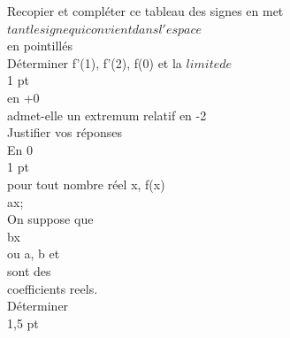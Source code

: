 
\begin{exercice}[Analyse]
\label{ex:58}

Recopier et compléter ce tableau des signes en met$tant le signe qui convient dans l'espace$\\
en pointillés\\
Déterminer f'(1), f'(2), f(0) et la $limite de$\\
1 pt\\
en +0\\
admet-elle un extremum relatif en -2\\
Justifier vos réponses\\
En 0\\
1 pt\\
pour tout nombre réel x, f(x)\\
ax;\\
On suppose que\\
bx\\
ou a, b et\\
sont des\\
coefficients reels.\\
Déterminer\\
1,5 pt\\

\end{exercice}

